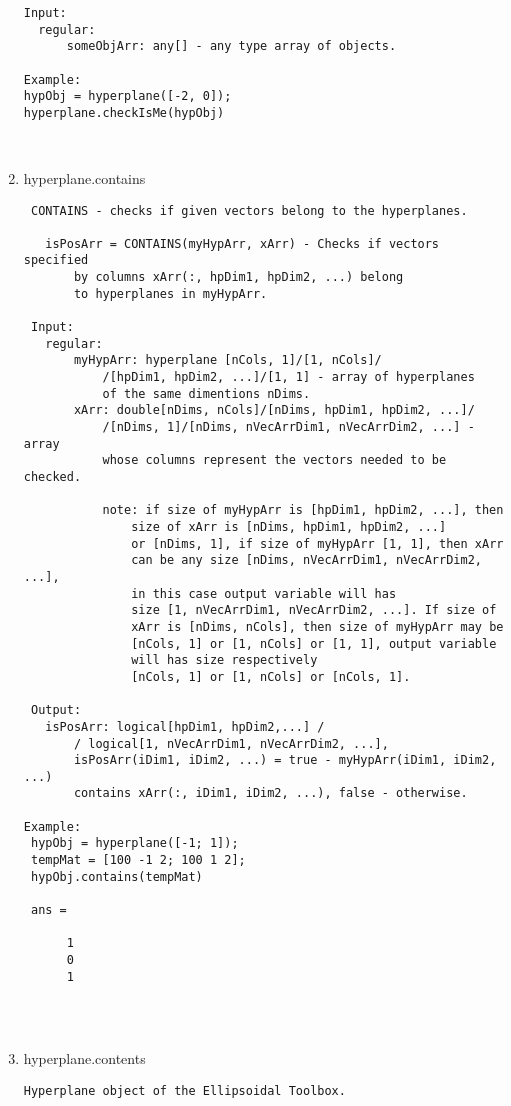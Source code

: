 \begin{enumerate}
\begin{lstlisting}
Input:
  regular:
      someObjArr: any[] - any type array of objects.

Example:
hypObj = hyperplane([-2, 0]);
hyperplane.checkIsMe(hypObj)



\end{lstlisting}
\fontfamily{\familydefault}
\selectfont
\item {hyperplane.contains}
\selectfont
\begin{lstlisting}
 CONTAINS - checks if given vectors belong to the hyperplanes.

   isPosArr = CONTAINS(myHypArr, xArr) - Checks if vectors specified
       by columns xArr(:, hpDim1, hpDim2, ...) belong
       to hyperplanes in myHypArr.

 Input:
   regular:
       myHypArr: hyperplane [nCols, 1]/[1, nCols]/
           /[hpDim1, hpDim2, ...]/[1, 1] - array of hyperplanes
           of the same dimentions nDims.
       xArr: double[nDims, nCols]/[nDims, hpDim1, hpDim2, ...]/
           /[nDims, 1]/[nDims, nVecArrDim1, nVecArrDim2, ...] - array
           whose columns represent the vectors needed to be checked.

           note: if size of myHypArr is [hpDim1, hpDim2, ...], then
               size of xArr is [nDims, hpDim1, hpDim2, ...]
               or [nDims, 1], if size of myHypArr [1, 1], then xArr
               can be any size [nDims, nVecArrDim1, nVecArrDim2, ...],
               in this case output variable will has
               size [1, nVecArrDim1, nVecArrDim2, ...]. If size of
               xArr is [nDims, nCols], then size of myHypArr may be
               [nCols, 1] or [1, nCols] or [1, 1], output variable
               will has size respectively
               [nCols, 1] or [1, nCols] or [nCols, 1].

 Output:
   isPosArr: logical[hpDim1, hpDim2,...] /
       / logical[1, nVecArrDim1, nVecArrDim2, ...],
       isPosArr(iDim1, iDim2, ...) = true - myHypArr(iDim1, iDim2, ...)
       contains xArr(:, iDim1, iDim2, ...), false - otherwise.

Example:
 hypObj = hyperplane([-1; 1]);
 tempMat = [100 -1 2; 100 1 2];
 hypObj.contains(tempMat)

 ans =

      1
      0
      1




\end{lstlisting}
\fontfamily{\familydefault}
\selectfont
\item {hyperplane.contents}
\selectfont
\begin{lstlisting}
Hyperplane object of the Ellipsoidal Toolbox.



\end{lstlisting}
\end{enumerate}
